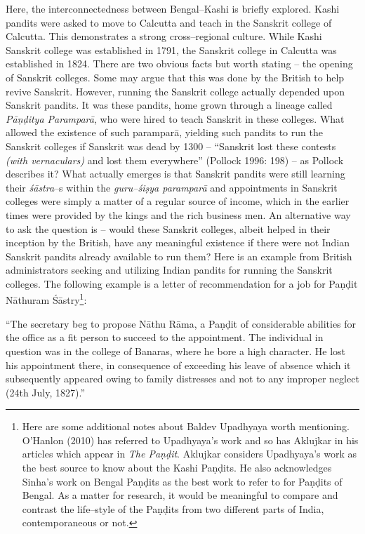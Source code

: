 Here, the interconnectedness between Bengal–Kashi is briefly explored. Kashi pandits were asked to move to Calcutta and teach in the Sanskrit college of Calcutta. This demonstrates a strong cross–regional culture. While Kashi Sanskrit college was established in 1791, the Sanskrit college in Calcutta was established in 1824. There are two obvious facts but worth stating – the opening of Sanskrit colleges. Some may argue that this was done by the British to help revive Sanskrit. However, running the Sanskrit college actually depended upon Sanskrit pandits. It was these pandits, home grown through a lineage called \textit{Pāṇḍitya Paramparā}, who were hired to teach Sanskrit in these colleges. What allowed the existence of such paramparā, yielding such pandits to run the Sanskrit colleges if Sanskrit was dead by 1300 – “Sanskrit lost these contests \textit{(with vernaculars)} and lost them everywhere” (Pollock 1996: 198) – as Pollock describes it? What actually emerges is that Sanskrit pandits were still learning their \textit{śāstra}–s within the \textit{guru–śiṣya paramparā} and appointments in Sanskrit colleges were simply a matter of a regular source of income, which in the earlier times were provided by the kings and the rich business men. An alternative way to ask the question is – would these Sanskrit colleges, albeit helped in their inception by the British, have any meaningful existence if there were not Indian Sanskrit pandits already available to run them? Here is an example from British administrators seeking and utilizing Indian pandits for running the Sanskrit colleges. The following example is a letter of recommendation for a job for Paṇḍit Nāthuram Śāstry\footnote{ Here are some additional notes about Baldev Upadhyaya worth mentioning. O’Hanlon (2010) has referred to Upadhyaya’s work and so has Aklujkar in his articles which appear in \textit{The Paṇḍit}. Aklujkar considers Upadhyaya’s work as the best source to know about the Kashi Paṇḍits. He also acknowledges Sinha’s work on Bengal Paṇḍits as the best work to refer to for Paṇḍits of Bengal. As a matter for research, it would be meaningful to compare and contrast the life–style of the Paṇḍits from two different parts of India, contemporaneous or not.}:

\begin{myquote}
“The secretary beg to propose Nāthu Rāma, a Paṇḍit of considerable abilities for the office as a fit person to succeed to the appointment. The individual in question was in the college of Banaras, where he bore a high character. He lost his appointment there, in consequence of exceeding his leave of absence which it subsequently appeared owing to family distresses and not to any improper neglect (24th July, 1827).”
\end{myquote}

